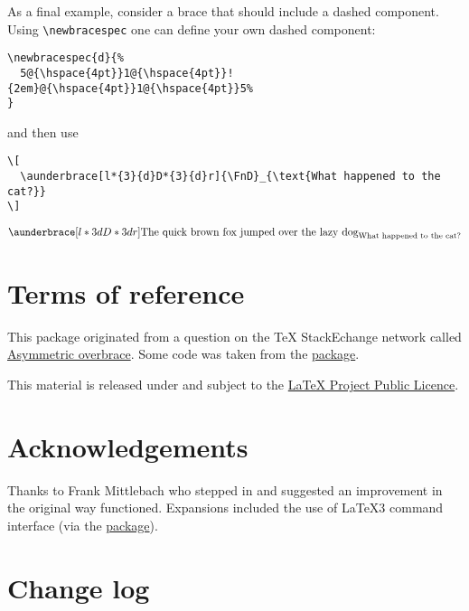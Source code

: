\documentclass[10pt]{ltxdockit}[2011/03/25]
\begin{document}
As a final example, consider a brace that should include a dashed component. Using \lstinline|\newbracespec| one can define your own dashed component:
\begin{lstlisting}
\newbracespec{d}{%
  5@{\hspace{4pt}}1@{\hspace{4pt}}!{2em}@{\hspace{4pt}}1@{\hspace{4pt}}5%
}
\end{lstlisting}
\noindent and then use
\begin{lstlisting}
\[
  \aunderbrace[l*{3}{d}D*{3}{d}r]{\FnD}_{\text{What happened to the cat?}}
\]
\end{lstlisting}
\[
  \newbracespec{d}{1@{\hspace{4pt}}1@{\hspace{4pt}}!{1em}@{\hspace{4pt}}1@{\hspace{4pt}}1}
  \aunderbrace[l*{3}{d}D*{3}{d}r]{\FnD}_{\text{What happened to the cat?}}
\]

\section{Terms of reference}

This package originated from a question on the TeX StackEchange network called \href{http://tex.stackexchange.com/q/68526/5764}{Asymmetric overbrace}. Some code was taken from the \href{http://ctan.org/pkg/mathtools}{ package}.

This material is released under and subject to the \href{https://latex-project.org/lppl/}{LaTeX Project Public Licence}.

\section{Acknowledgements}

Thanks to Frank Mittlebach who stepped in and suggested an improvement in the original way  functioned. Expansions included the use of \LaTeX3 command interface (via the \href{http://ctan.org/pkg/xparse}{ package}).

\section{Change log}
\end{document}
